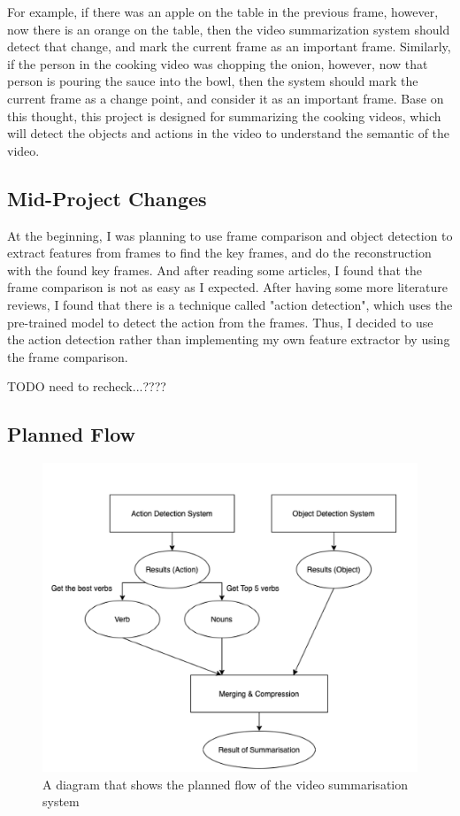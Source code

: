 \documentclass{article}
\begin{document}
For example, if there was an apple on the table in the previous frame, however, now there is an orange on the table, then the video summarization system should detect that change, and mark the current frame as an important frame. Similarly, if the person in the cooking video was chopping the onion, however, now that person is pouring the sauce into the bowl, then the system should mark the current frame as a change point, and consider it as an important frame. Base on this thought, this project is designed for summarizing the cooking videos, which will detect the objects and actions in the video to understand the semantic of the video.

\subsection{Mid-Project Changes}

At the beginning, I was planning to use frame comparison and object detection to extract features from frames to find the key frames, and do the reconstruction with the found key frames. And after reading some articles, I found that the frame comparison is not as easy as I expected. After having some more literature reviews, I found that there is a technique called "action detection", which uses the pre-trained model to detect the action from the frames. Thus, I decided to use the action detection rather than implementing my own feature extractor by using the frame comparison.

TODO need to recheck...????

\subsection{Planned Flow}

\begin{figure}[H]
    \centering
    \includegraphics[scale=0.4]{imgs/PlannedFlow.png}
    \caption{A diagram that shows the planned flow of the video summarisation system}
    \label{fig:planned_flow}
\end{figure}
\end{document}
